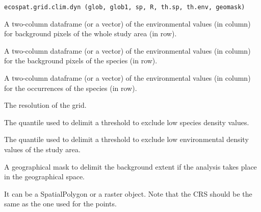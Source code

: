 \documentclass[a4paper]{book}
\begin{document}
%
\begin{Usage}
\begin{verbatim}
ecospat.grid.clim.dyn (glob, glob1, sp, R, th.sp, th.env, geomask)
\end{verbatim}
\end{Usage}
%
\begin{Arguments}
\begin{ldescription}
\item[\code{glob}] A two-column dataframe (or a vector) of the environmental values (in column) for background pixels of the whole study area (in row).
\item[\code{glob1}] A two-column dataframe (or a vector) of the environmental values (in column) for the background pixels of the species (in row).
\item[\code{sp}] A two-column dataframe (or a vector) of the environmental values (in column) for the occurrences of the species (in row).
\item[\code{R}] The resolution of the grid.
\item[\code{th.sp}] The quantile used to delimit a threshold to exclude low species density values.
\item[\code{th.env}] The quantile used to delimit a threshold to exclude low environmental density values of the study area.
\item[\code{geomask}] A geographical mask to delimit the background extent if the analysis takes place in the geographical space.

It can be a SpatialPolygon or a raster object. Note that the CRS should be the same as the one used for the points.


\end{ldescription}
\end{Arguments}
%
\end{document}
